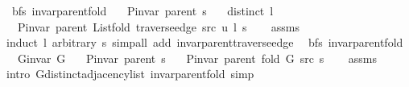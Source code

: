 \begin{isabellebody}
\ {\isacharparenleft}{\kern0pt}\ bfs{\isacharparenright}{\kern0pt}\ invar{\isacharunderscore}{\kern0pt}parent{\isacharunderscore}{\kern0pt}fold{\isacharcolon}{\kern0pt}\isanewline
\ \ \ {\isachardoublequoteopen}P{\isacharunderscore}{\kern0pt}invar\ {\isacharparenleft}{\kern0pt}parent\ s{\isacharparenright}{\kern0pt}{\isachardoublequoteclose}\isanewline
\ \ \ {\isachardoublequoteopen}distinct\ l{\isachardoublequoteclose}\isanewline
\ \ \ {\isachardoublequoteopen}P{\isacharunderscore}{\kern0pt}invar\ {\isacharparenleft}{\kern0pt}parent\ {\isacharparenleft}{\kern0pt}List{\isachardot}{\kern0pt}fold\ {\isacharparenleft}{\kern0pt}traverse{\isacharunderscore}{\kern0pt}edge\ src\ u{\isacharparenright}{\kern0pt}\ l\ s{\isacharparenright}{\kern0pt}{\isacharparenright}{\kern0pt}{\isachardoublequoteclose}\isanewline
%
\isadelimproof
\ \ %
\endisadelimproof
%
\isatagproof
{}\isamarkupfalse%
\ assms\isanewline
\ \ \isamarkupfalse%
\ {\isacharparenleft}{\kern0pt}induct\ l\ arbitrary{\isacharcolon}{\kern0pt}\ s{\isacharparenright}{\kern0pt}\ {\isacharparenleft}{\kern0pt}simp{\isacharunderscore}{\kern0pt}all\ add{\isacharcolon}{\kern0pt}\ invar{\isacharunderscore}{\kern0pt}parent{\isacharunderscore}{\kern0pt}traverse{\isacharunderscore}{\kern0pt}edge{\isacharparenright}{\kern0pt}%
\endisatagproof
{\isafoldproof}%
%
\isadelimproof
\isanewline
%
\endisadelimproof
\isanewline
{}\isamarkupfalse%
\ {\isacharparenleft}{\kern0pt}\ bfs{\isacharparenright}{\kern0pt}\ invar{\isacharunderscore}{\kern0pt}parent{\isacharunderscore}{\kern0pt}fold{\isacharunderscore}{\kern0pt}{}{\isacharcolon}{\kern0pt}\isanewline
\ \ \ {\isachardoublequoteopen}G{\isachardot}{\kern0pt}invar\ G{\isachardoublequoteclose}\isanewline
\ \ \ {\isachardoublequoteopen}P{\isacharunderscore}{\kern0pt}invar\ {\isacharparenleft}{\kern0pt}parent\ s{\isacharparenright}{\kern0pt}{\isachardoublequoteclose}\isanewline
\ \ \ {\isachardoublequoteopen}P{\isacharunderscore}{\kern0pt}invar\ {\isacharparenleft}{\kern0pt}parent\ {\isacharparenleft}{\kern0pt}fold\ G\ src\ s{\isacharparenright}{\kern0pt}{\isacharparenright}{\kern0pt}{\isachardoublequoteclose}\isanewline
%
\isadelimproof
\ \ %
\endisadelimproof
%
\isatagproof
{}\isamarkupfalse%
\ assms\isanewline
\ \ \isamarkupfalse%
\ {\isacharparenleft}{\kern0pt}intro\ G{\isachardot}{\kern0pt}distinct{\isacharunderscore}{\kern0pt}adjacency{\isacharunderscore}{\kern0pt}list\ invar{\isacharunderscore}{\kern0pt}parent{\isacharunderscore}{\kern0pt}fold{\isacharparenright}{\kern0pt}\ simp{\isacharplus}{\kern0pt}%

\end{isabellebody}
